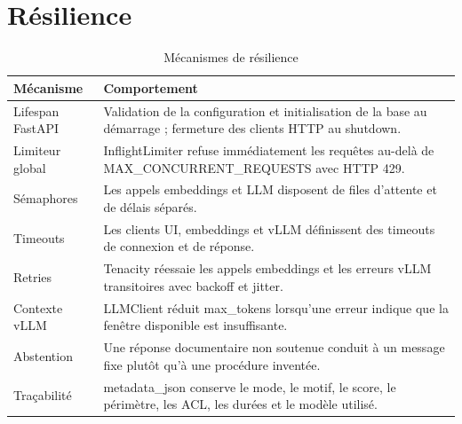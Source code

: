\section{Résilience}
\begin{table}[H]
\centering
\caption{Mécanismes de résilience}
\label{tab:resilience_impl_ch6}
\begin{tabular}{p{3.5cm}p{9.7cm}}
\toprule
\textbf{Mécanisme} & \textbf{Comportement} \\
\midrule
Lifespan FastAPI & Validation de la configuration et initialisation de la base au démarrage ; fermeture des clients HTTP au shutdown. \\
Limiteur global & InflightLimiter refuse immédiatement les requêtes au-delà de MAX\_CONCURRENT\_REQUESTS avec HTTP 429. \\
Sémaphores & Les appels embeddings et LLM disposent de files d’attente et de délais séparés. \\
Timeouts & Les clients UI, embeddings et vLLM définissent des timeouts de connexion et de réponse. \\
Retries & Tenacity réessaie les appels embeddings et les erreurs vLLM transitoires avec backoff et jitter. \\
Contexte vLLM & LLMClient réduit max\_tokens lorsqu’une erreur indique que la fenêtre disponible est insuffisante. \\
Abstention & Une réponse documentaire non soutenue conduit à un message fixe plutôt qu’à une procédure inventée. \\
Traçabilité & metadata\_json conserve le mode, le motif, le score, le périmètre, les ACL, les durées et le modèle utilisé. \\
\bottomrule
\end{tabular}
\end{table}